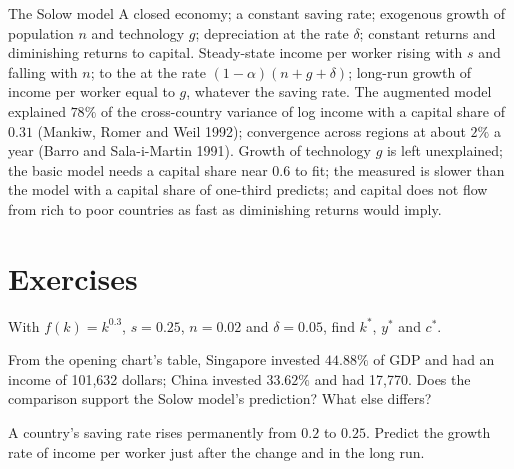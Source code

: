 \begin{model}{The Solow model}
\assumes A closed economy; a constant saving rate; exogenous growth of
population $n$ and technology $g$; depreciation at the rate $\delta$; constant returns
and diminishing returns to capital.
\predicts Steady-state income per worker rising with $s$ and falling with $n$;
 to the  at the rate $(1 - \alpha)(n + g + \delta)$;
long-run growth of income per worker equal to $g$, whatever the saving rate.
\tested The augmented model explained $78\%$ of the cross-country variance
of log income with a capital share of $0.31$ (Mankiw, Romer and Weil 1992);
convergence across regions at about $2\%$ a year (Barro and Sala-i-Martin
1991). %
\breaks Growth of technology $g$ is left unexplained; the basic model needs a
capital share near $0.6$ to fit; the measured  is
slower than the model with a capital share of one-third predicts; and
capital does not flow from rich to poor countries as fast as diminishing
returns would imply.
\end{model}

\section*{Exercises}\label{sec:b1:solow-model:exercises}

\begin{exercise}[$\star$]\label{exo:b1:solow-model:steady}
With $f(k) = k^{0.3}$, $s = 0.25$, $n = 0.02$ and $\delta = 0.05$, find $k^*$, $y^*$ and $c^*$.
\end{exercise}

\begin{exercise}[$\star$]\label{exo:b1:solow-model:read}
From the opening chart's table, Singapore invested $44.88\%$ of GDP and had
an income of 101,632 dollars; China invested $33.62\%$ and had 17,770.
Does the comparison support the Solow model's prediction? What else
differs?
\end{exercise}

\begin{exercise}[$\star$]\label{exo:b1:solow-model:predict}
A country's saving rate rises permanently from $0.2$ to $0.25$. Predict the
growth rate of income per worker just after the change and in the long run.
\end{exercise}

